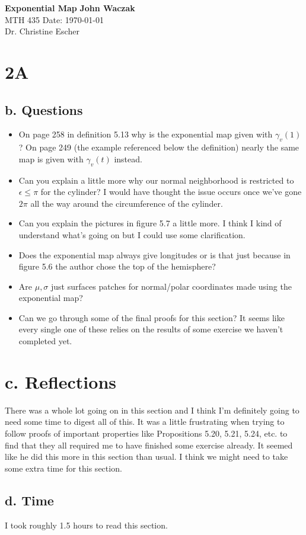 \documentclass[a4paper, 11pt]{article}
\begin{document}
\noindent
\large\textbf{Exponential Map} \hfill \textbf{John Waczak} \\
\normalsize MTH 435 \hfill  Date: \today \\
Dr. Christine Escher \\

\section*{2A}
	\subsection*{b. Questions}
		\begin{itemize}
			\item	On page 258 in definition 5.13 why is the exponential map given with $\gamma_v(1)$? On page 249 (the example referenced below the definition) nearly the same map is given with $\gamma_v(t)$ instead. 

			\item Can you explain a little more why our normal neighborhood is restricted to $\epsilon \leq \pi$ for the cylinder? I would have thought the issue occurs once we've gone $2\pi$ all the way around the circumference of the cylinder. 
			
			\item Can you explain the pictures in figure 5.7 a little more. I think I kind of understand what's going on but I could use some clarification. 
			
			\item Does the exponential map always give longitudes or is that just because in figure 5.6 the author chose the top of the hemisphere? 
			
			\item Are $\mu, \sigma$ just surfaces patches for normal/polar coordinates made using the exponential map? 
			
			\item Can we go through some of the final proofs for this section? It seems like every single one of these relies on the results of some exercise we haven't completed yet.
		\end{itemize}	
	
	\section*{c. Reflections}
	There was a whole lot going on in this section and I think I'm definitely going to need some time to digest all of this. It was a little frustrating when trying to follow proofs of important properties like Propositions 5.20, 5.21, 5.24, etc. to find that they all required me to have finished some exercise already. It seemed like he did this more in this section than usual. I think we might need to take some extra time for this section. 
	
	\subsection*{d. Time}
	I took roughly 1.5 hours to read this section. 
\end{document}
